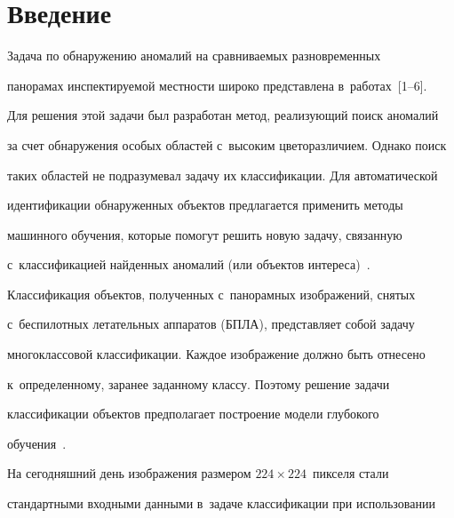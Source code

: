  \thispagestyle{headings}


 


 \vspace*{-18pt}








\section{Введение}





  Задача по обнаружению аномалий на сравниваемых разновременных 


панорамах инспектируемой местности широко представлена в~работах~[1--6]. 


Для решения этой задачи был разработан метод, реализующий поиск аномалий 


за счет обнаружения особых областей с~высоким цветоразличием. Однако поиск 


таких областей не подразумевал задачу их классификации. Для автоматической 


идентификации обнаруженных объектов предлагается применить методы 


машинного обучения, которые помогут решить новую задачу, связанную 


с~классификацией найденных аномалий (или объектов интереса)~\cite{7-ar}.


  


  Классификация объектов, полученных с~панорамных изображений, снятых 


с~беспилотных летательных аппаратов (БПЛА), представляет собой задачу 


многоклассовой классификации. Каждое изображение должно быть отнесено 


к~определенному, заранее заданному классу. Поэтому решение задачи 


классификации объектов предполагает построение модели глубокого 


обучения~\cite{8-ar}.


  


  На сегодняшний день изображения размером $224 \times 224$~пикселя стали 


стандартными входными данными в~задаче классификации при использовании 


